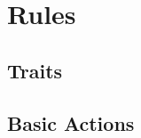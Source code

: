 \chapter[Induction]{Rules}
\label{coreRules}


\section{Traits}

\begin{multicols}{2}





\end{multicols}

\section{Basic Actions}
\label{basicaction}


